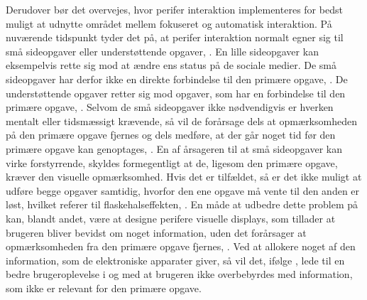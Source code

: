 Derudover bør det overvejes, hvor perifer interaktion implementeres for bedst muligt at udnytte området mellem fokuseret og automatisk interaktion. På nuværende tidspunkt tyder det på, at perifer interaktion normalt egner sig til små sideopgaver eller understøttende opgaver, \parencite[s. 21]{PDF:EvaluatingPI}. En lille sideopgaver kan eksempelvis rette sig mod at ændre ens status på de sociale medier. De små sideopgaver har derfor ikke en direkte forbindelse til den primære opgave, \parencite[s. 162]{PDF:ComparingInputModalities}. De understøttende opgaver retter sig mod opgaver, som har en forbindelse til den primære opgave, \parencite[s. 21]{PDF:EvaluatingPI}. Selvom de små sideopgaver ikke nødvendigvis er hverken mentalt eller tidsmæssigt krævende, så vil de forårsage dels at opmærksomheden på den primære opgave fjernes og dels medføre, at der går noget tid før den primære opgave kan genoptages, \parencite[s. 162]{PDF:ComparingInputModalities}. En af årsageren til at små sideopgaver kan virke forstyrrende, skyldes formegentligt at de, ligesom den primære opgave, kræver den visuelle opmærksomhed. Hvis det er tilfældet, så er det ikke muligt at udføre begge opgaver samtidig, hvorfor den ene opgave må vente til den anden er løst, hvilket referer til flaskehalseffekten, \parencite[s. 240]{PDF:PICharacteristicsAndConsiderations}. En måde at udbedre dette problem på kan, blandt andet, være at designe perifere visuelle displays, som tillader at brugeren bliver bevidst om noget information, uden det forårsager at opmærksomheden fra den primære opgave fjernes, \parencite[s. 247]{PDF:AToolkitForManaging}. Ved at allokere noget af den information, som de elektroniske apparater giver, så vil det, ifølge \textcite[s. 55]{PDF:PITheoriesKap3}, lede til en bedre brugeroplevelse i og med at brugeren ikke overbebyrdes med information, som ikke er relevant for den primære opgave. 

